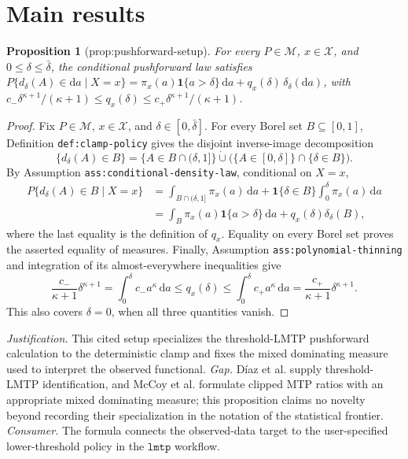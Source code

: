 \documentclass{article}
\newtheorem{proposition}{Proposition}
\begin{document}
\section{Main results}

\begin{proposition}[prop:pushforward-setup]\label{prop:pushforward-setup}
For every \(P\in\mathcal M\), \(x\in\mathcal X\), and \(0\leq\delta\leq\bar\delta\), the conditional pushforward law satisfies \(P\{d_\delta(A)\in\mathrm da\mid X=x\}=\pi_x(a)\mathbf 1\{a>\delta\}\,\mathrm da+q_x(\delta)\,\delta_\delta(\mathrm da)\), with \(c_-\delta^{\kappa+1}/(\kappa+1)\leq q_x(\delta)\leq c_+\delta^{\kappa+1}/(\kappa+1)\).
\end{proposition}
\begin{proof}
Fix \(P\in\mathcal M\), \(x\in\mathcal X\), and \(\delta\in[0,\bar\delta]\).  For every Borel set \(B\subseteq[0,1]\), Definition \texttt{def:clamp-policy} gives the disjoint inverse-image decomposition
\[
 \{d_\delta(A)\in B\}
 =\{A\in B\cap(\delta,1]\}
   \mathbin{\dot\cup}
   \bigl(\{A\in[0,\delta]\}\cap\{\delta\in B\}\bigr).
\]
By Assumption \texttt{ass:conditional-density-law}, conditional on \(X=x\),
\[
 \begin{aligned}
 P\{d_\delta(A)\in B\mid X=x\}
 &=\int_{B\cap(\delta,1]}\pi_x(a)\,\mathrm da
   +\mathbf 1\{\delta\in B\}\int_0^\delta\pi_x(a)\,\mathrm da\\
 &=\int_B\pi_x(a)\mathbf 1\{a>\delta\}\,\mathrm da
   +q_x(\delta)\delta_\delta(B),
 \end{aligned}
\]
where the last equality is the definition of \(q_x\).  Equality on every Borel set proves the asserted equality of measures.  Finally, Assumption \texttt{ass:polynomial-thinning} and integration of its almost-everywhere inequalities give
\[
 \frac{c_-}{\kappa+1}\delta^{\kappa+1}
 =\int_0^\delta c_-a^\kappa\,\mathrm da
 \le q_x(\delta)
 \le\int_0^\delta c_+a^\kappa\,\mathrm da
 =\frac{c_+}{\kappa+1}\delta^{\kappa+1}.
\]
This also covers \(\delta=0\), when all three quantities vanish.
\end{proof}
\par\smallskip\noindent \textit{Justification.} This cited setup specializes the threshold-LMTP pushforward calculation to the deterministic clamp and fixes the mixed dominating measure used to interpret the observed functional. \textit{Gap.} Díaz et al. supply threshold-LMTP identification, and McCoy et al. formulate clipped MTP ratios with an appropriate mixed dominating measure; this proposition claims no novelty beyond recording their specialization in the notation of the statistical frontier. \textit{Consumer.} The formula connects the observed-data target to the user-specified lower-threshold policy in the \(\texttt{lmtp}\) workflow.
\end{document}
